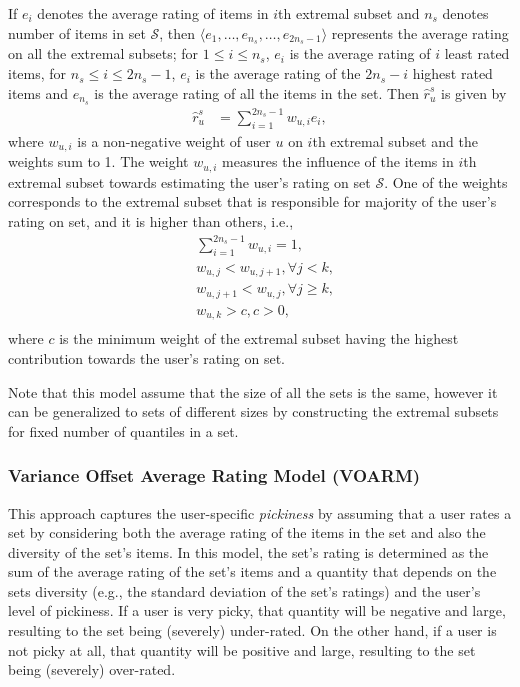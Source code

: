 If $e_i$ denotes the average rating of items in $i$th extremal
subset and $n_s$ denotes number of items in set $\mathcal{S}$, 
then $\langle e_1, \ldots, e_{n_s}, \ldots, e_{2n_s - 1} \rangle$ represents
the average rating on all the extremal subsets; for $1 \le i \le
n_s$, $e_i$ is the average rating of $i$ least rated
items, for $n_s \le i \le 2n_s - 1 $, $e_i$ is the average rating
of the $2n_s - i$ highest rated items and $e_{n_s}$ is the average rating of all
the items in the set. Then $\hat{r}_{u}^s$ is given by
\begin{equation} \label{avgbuckacteq}
  \begin{split}
    \hat{r}_{u}^s &= \sum_{i=1}^{2n_s - 1} w_{u,i} e_{i},
  \end{split}
\end{equation}
\noindent where $w_{u,i}$ is a non-negative weight of user $u$ on
$i$th extremal subset and the weights sum to 1.
The weight $w_{u,i}$ measures the influence of the items in $i$th extremal subset 
towards estimating the user's rating on set $\mathcal{S}$.
One of the weights corresponds to the extremal subset that is responsible for majority of the user's rating on set, and it is higher than others, i.e.,
\begin{equation} \label{esqpmodel_eq}
	\begin{aligned}  
        & \sum_{i=1}^{2n_s - 1}w_{u,i}=1,  \\
        & w_{u, j} < w_{u, j+1}, \forall j < k, \\
        & w_{u, j+1} < w_{u, j}, \forall j \ge k, \\
        & w_{u,k} > c,  c > 0, \\
     \end{aligned}
\end{equation}
\noindent where $c$ is the minimum weight of the extremal subset having the
    highest contribution towards the user's rating on set.


Note that this model assume
that the size of all the sets is the same, however it can be generalized to sets
of different sizes by constructing the extremal subsets for fixed number
of quantiles in a set.



\subsubsection*{Variance Offset Average Rating Model (VOARM)}
This approach captures the user-specific \emph{pickiness} by assuming that a user rates a set by considering both the
average rating of the items in the set
and also the diversity of the set's items. In this model, the set's rating is
determined as the sum of the average
rating of the set's items and a quantity that depends on the sets diversity
(e.g.,
the standard deviation of the set's ratings) and the user's level of
pickiness. 
If a user is very picky, that quantity will be
negative and large, resulting to the set being
(severely) under-rated. On the other hand, if a user is not picky at all, that
quantity will be positive and large, resulting to the 
set being (severely) over-rated. 

